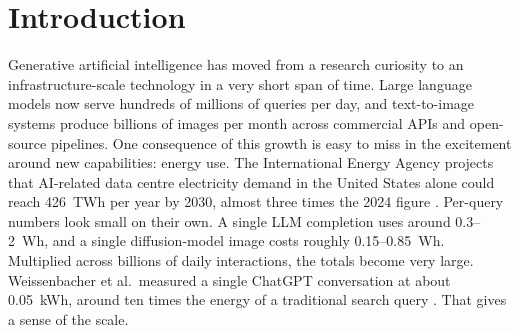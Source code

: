 \documentclass[AMS,STIX2COL]{WileyNJD-v2}
\begin{document}


\maketitle

\section{Introduction}\label{sec1}

Generative artificial intelligence has moved from a research curiosity to an infrastructure-scale technology in a very short span of time. Large language models now serve hundreds of millions of queries per day, and text-to-image systems produce billions of images per month across commercial APIs and open-source pipelines. One consequence of this growth is easy to miss in the excitement around new capabilities: energy use. The International Energy Agency projects that AI-related data centre electricity demand in the United States alone could reach 426~TWh per year by 2030, almost three times the 2024 figure \cite{iea2024electricity}. Per-query numbers look small on their own. A single LLM completion uses around 0.3--2~Wh, and a single diffusion-model image costs roughly 0.15--0.85~Wh. Multiplied across billions of daily interactions, the totals become very large. Weissenbacher et al.\ measured a single ChatGPT conversation at about 0.05~kWh, around ten times the energy of a traditional search query \cite{weissenbacher2025energy}. That gives a sense of the scale.
\end{document}
